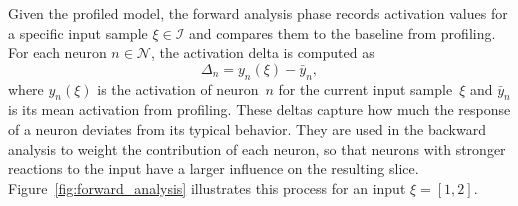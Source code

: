 \documentclass[
12pt,
fancyheadings,
a4paper,
twoside,
BCOR=0.7cm,
nobcorignoretitle,
grayscalebody,
]{stsreprt}
\begin{document}
Given the profiled model, the forward analysis phase records activation values for a specific input
sample $\xi \in \mathcal{I}$ and compares them to the baseline from profiling.
For each neuron $n \in \mathcal{N}$, the activation delta is computed as
\begin{equation}
    \Delta_n = y_n(\xi) - \bar{y}_n,
\end{equation}
where $y_n(\xi)$ is the activation of neuron~$n$ for the current input sample~$\xi$ and $\bar{y}_n$
is its mean activation from profiling.
These deltas capture how much the response of a neuron deviates from its typical behavior.
They are used in the backward analysis to weight the contribution of each neuron, so that neurons
with stronger reactions to the input have a larger influence on the resulting slice.
Figure~\ref{fig:forward_analysis} illustrates this process for an input $\xi = [1, 2]$.
\end{document}

